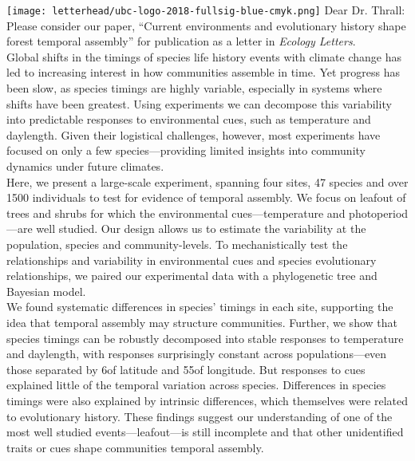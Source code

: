 \documentclass[11pt,a4paper]{article}
\begin{document}

\noindent \texttt{[image: letterhead/ubc-logo-2018-fullsig-blue-cmyk.png]}
\noindent Dear Dr. Thrall:
\vspace{1.5ex}\\
\noindent Please consider our paper, ``Current environments and evolutionary history shape forest temporal assembly'' for publication as a letter in \emph{Ecology Letters}. 
\vspace{1.5ex}\\ 
Global shifts in the timings of species life history events with climate change has led to increasing interest in how communities assemble in time. Yet progress has been slow, as species timings are highly variable, especially in systems where shifts have been greatest. Using experiments we can decompose this variability into predictable responses to environmental cues, such as temperature and daylength. Given their logistical challenges, however, most experiments have focused on only a few species---providing limited insights into community dynamics under future climates. %
\vspace{1.5ex}\\
\noindent %
Here, we present a large-scale experiment, spanning four sites, 47 species and over 1500 individuals to test for evidence of temporal assembly.  We focus on leafout of trees and shrubs for which the environmental cues---temperature and photoperiod---are well studied. Our design allows us to estimate the variability at the population, species and community-levels. To mechanistically test the relationships and variability in environmental cues and species evolutionary relationships, we paired our experimental data with a phylogenetic tree and Bayesian model. 
\vspace{1.5 ex}\\
\noindent  We found systematic differences in species' timings in each site, supporting the idea that temporal assembly may structure communities. Further, we show that species timings can be robustly decomposed into stable responses to temperature and daylength, with responses surprisingly constant across populations---even those separated by 6\textdegree  of latitude and 55\textdegree  of longitude. But responses to cues explained little of the temporal variation across species. Differences in species timings were also explained by intrinsic differences, which themselves were related to evolutionary history. These findings suggest our understanding of one of the most well studied events---leafout---is still incomplete and that other unidentified traits or cues shape communities temporal assembly. 
\end{document}
